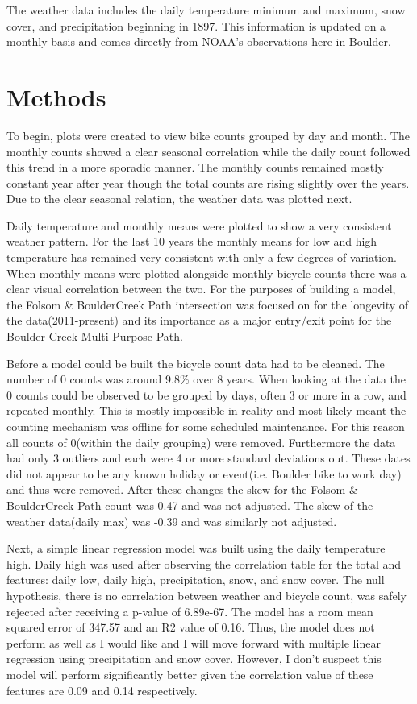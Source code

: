 \documentclass[twoside]{article}
\begin{document}
\begin{multicols}{2}
The weather data includes the daily temperature minimum and maximum, snow cover, and precipitation beginning in 1897. This information is updated on a monthly basis and comes directly from NOAA's observations here in Boulder.

\section{Methods}

To begin, plots were created to view bike counts grouped by day and month. The monthly counts showed a clear seasonal correlation while the daily count followed this trend in a more sporadic manner. The monthly counts remained mostly constant year after year though the total counts are rising slightly over the years. Due to the clear seasonal relation, the weather data was plotted next.  

Daily temperature and monthly means were plotted to show a very consistent weather pattern. For the last 10 years the monthly means for low and high temperature has remained very consistent with only a few degrees of variation. When monthly means were plotted alongside monthly bicycle counts there was a clear visual correlation between the two. For the purposes of building a model, the Folsom \& BoulderCreek Path intersection was focused on for the longevity of the data(2011-present) and its importance as a major entry/exit point for the Boulder Creek Multi-Purpose Path.  

Before a model could be built the bicycle count data had to be cleaned. The number of 0 counts was around 9.8\% over 8 years. When looking at the data the 0 counts could be observed to be grouped by days, often 3 or more in a row, and repeated monthly. This is mostly impossible in reality and most likely meant the counting mechanism was offline for some scheduled maintenance. For this reason all counts of 0(within the daily grouping) were removed. Furthermore the data had only 3 outliers and each were 4 or more standard deviations out. These dates did not appear to be any known holiday or event(i.e. Boulder bike to work day) and thus were removed. After these changes the skew for the Folsom \& BoulderCreek Path count was 0.47 and was not adjusted. The skew of the weather data(daily max) was -0.39 and was similarly not adjusted.  

Next, a simple linear regression model was built using the daily temperature high. Daily high was used after observing the correlation table for the total and features: daily low, daily high, precipitation, snow, and snow cover. The null hypothesis, there is no correlation between weather and bicycle count, was safely rejected after receiving a p-value of 6.89e-67. The model has a room mean squared error of 347.57 and an R2 value of 0.16. Thus, the model does not perform as well as I would like and I will move forward with multiple linear regression using precipitation and snow cover. However, I don't suspect this model will perform significantly better given the correlation value of these features are 0.09 and 0.14 respectively.  


\end{multicols}
\end{document}
